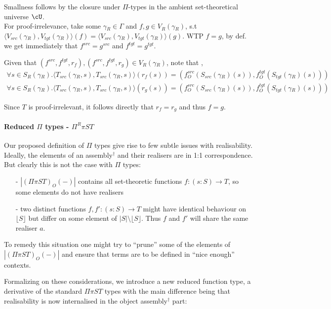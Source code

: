 \documentclass[12pt,a4paper]{article}
\def\src{_{src}}
\def\tgt{_{tgt}}
\renewcommand{\O}{_{O}}\alwaysmath{O}
\newcommand{\R}{\ensuremath{_{R}}}
\def\assembly{assembly$^\dagger$\xspace}
\begin{document}
Smallness follows by the closure under $\Pi$-types in the ambient set-theoretical universe $\cU$.\\
For proof-irrelevance, take some $\gamma\R \in \Gamma$ and $f , g \in V\R(\gamma\R)$, s.t $\langle V\src(\gamma\R), V\tgt(\gamma\R) \rangle (f) = \langle V\src(\gamma\R), V\tgt(\gamma\R) \rangle (g)$. WTP $f = g$, by def. we get immediately that $f^{src} = g^{src}$ and $f^{tgt} = g^{tgt}$. 

Given that $(f^{src}, f^{tgt}, r_f), (f^{src}, f^{tgt}, r_g) \in V\R(\gamma\R)$, note that , 
\begin{align*}
  \forall s \in S\R(\gamma\R). \langle T\src(\gamma\R, s), T\src(\gamma\R, s) \rangle  ( r_f(s)) = (f\O^{src}(S\src(\gamma\R)(s)), f\O^{tgt}(S\tgt(\gamma\R)(s)))\\
  \forall s \in S\R(\gamma\R). \langle T\src(\gamma\R, s), T\src(\gamma\R, s) \rangle  ( r_g(s)) = (f\O^{src}(S\src(\gamma\R)(s)), f\O^{tgt}(S\tgt(\gamma\R)(s)))
\end{align*}

Since $T$ is proof-irrelevant, it follows directly that $r_f = r_g$ and thus $f = g$. 

\paragraph*{Reduced $\Pi$ types - $\Pi^R \pi S T$}
Our proposed definition of $\Pi$ types give rise to few subtle issues with realisability. Ideally, the elements of an \assembly and their realisers are in 1:1 correspondence. But clearly this is not the case with $\Pi$ types:
\begin{itemize}[noitemsep]
  \item[-] $|(\Pi \pi S T)\O(-)|$ contains all set-theoretic functions $f: (s : S) \to T $, so some elements do not have realisers
  
  \item[-] two distinct functions $f, f' : (s : S) \to T$ might have identical behaviour on $\lfloor S \rfloor$ but differ on some element of $|S|\setminus \lfloor S \rfloor$. Thus $f$ and $f'$ will share the same realiser $a$.
\end{itemize}
To remedy this situation one might try to ``prune'' some of the elements of $|(\Pi \pi S T)\O(-)|$ and ensure that terms are to be defined in ``nice enough'' contexts.

Formalizing on these considerations, we introduce a new reduced function type, a derivative of the standard $\Pi \pi S T$ types with the main difference being that realisability is now internalised in the object \assembly part:\\
\end{document}
